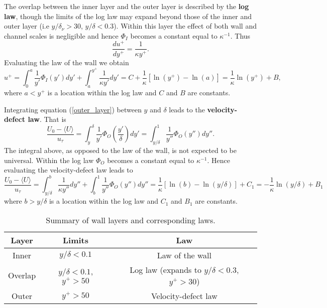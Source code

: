 \documentclass[oneside,a4paper,11pt]{report}
\begin{document}
The overlap between the inner layer and the outer layer is described by the \textbf{log law}, though the limits of the log law may expand beyond those of the inner and outer layer (i.e $y/\delta_\nu > 30$, $y/\delta < 0.3$). Within this layer the effect of both wall and channel scales is negligible and hence $\Phi_I$ becomes a constant equal to $\kappa^{-1}$. Thus
\begin{equation}
\frac{du^+}{dy^+} = \frac{1}{\kappa y^+} .
\end{equation}
Evaluating the law of the wall we obtain
\begin{equation}
u^+ = \int_0^{a} \frac{1}{y'} \Phi_I (y') dy' + \int_a^{y^+} \frac{1}{\kappa y'} dy' = C + \frac{1}{\kappa} [ \ln(y^+) - \ln(a)] = \frac{1}{\kappa} \ln(y^+) + B,
\end{equation}
where $a < y^+$ is a location within the log law and $C$ and $B$ are constants.

Integrating equation (\ref{outer_layer}) between $y$ and $\delta$ leads to the \textbf{velocity-defect law}. That is
\begin{equation}
\frac{U_0 - \langle U \rangle}{u_\tau} = \int_y^\delta \frac{1}{y'} \Phi_O(\frac{y'}{\delta}) dy' = \int_{y/\delta}^1 \frac{1}{y''} \Phi_O(y'') dy''.
\end{equation}
The integral above, as opposed to the law of the wall, is not expected to be universal. Within the log law $\Phi_O$ becomes a constant equal to $\kappa^{-1}$. Hence evaluating the velocity-defect law leads to
\begin{equation}
\frac{U_0 - \langle U \rangle}{u_\tau} = \int_{y/\delta}^b \frac{1}{\kappa y''} dy'' + \int_b^1 \frac{1}{y''}\Phi_O(y'')dy'' = \frac{1}{\kappa} [\ln(b) - \ln(y/\delta)] + C_1 = -\frac{1}{\kappa} \ln(y/\delta) + B_1
\end{equation}
where $b > y/\delta$ is a location within the log law and $C_1$ and $B_1$ are constants.

\begin{table}
\centering
\begin{tabular}{ | c | c | c |}
  \hline
  Layer & Limits & Law \\
  \hline
  Inner & $y/\delta < 0.1$ & Law of the wall \\
  \hline
  Overlap & $y/\delta < 0.1$, $y^+ > 50$ & Log law (expands to $y/\delta < 0.3$, $y^+>30$) \\
  \hline
  Outer & $y^+ > 50$ & Velocity-defect law\\
  \hline
\end{tabular}
\caption{Summary of wall layers and corresponding laws.}
\end{table}
\end{document}
